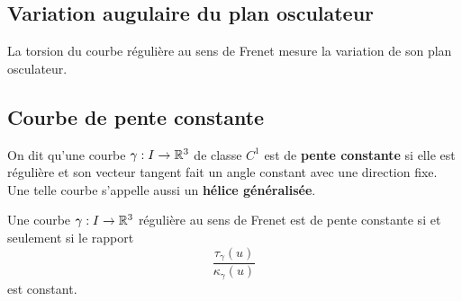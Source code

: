 \subsection{Variation augulaire du plan osculateur}

\begin{proposition}
	La torsion du courbe régulière au sens de Frenet mesure la variation de son plan osculateur.
\end{proposition}


\subsection{Courbe de pente constante}

\begin{definition}
	On dit qu'une courbe $\gamma : I \to \mathbb{R}^3$ de classe $C^1$ est de \textbf{pente constante} si elle est régulière et son vecteur tangent fait un angle constant avec une direction fixe. Une telle courbe s'appelle aussi un \textbf{hélice généralisée}.
\end{definition}

\begin{theoreme}
	Une courbe $\gamma : I \to \mathbb{R}^3$ régulière au sens de Frenet est de pente constante si et seulement si le rapport
	\[
	\frac{\tau_\gamma(u)}{\kappa_\gamma(u)}
	\]
	est constant.
\end{theoreme}


